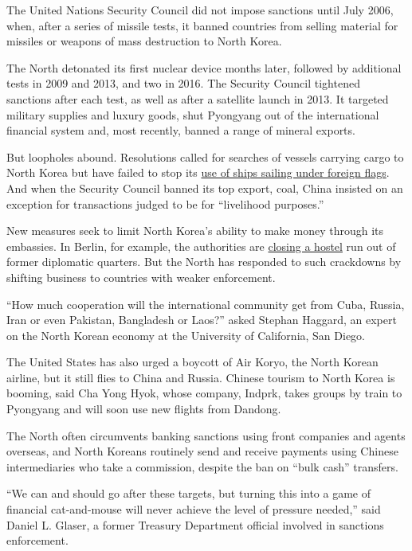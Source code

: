 The United Nations Security Council did not impose sanctions until July
2006, when, after a series of missile tests, it banned countries from
selling material for missiles or weapons of mass destruction to North
Korea.

The North detonated its first nuclear device months later, followed by
additional tests in 2009 and 2013, and two in 2016. The Security Council
tightened sanctions after each test, as well as after a satellite launch
in 2013. It targeted military supplies and luxury goods, shut Pyongyang
out of the international financial system and, most recently, banned a
range of mineral exports.

But loopholes abound. Resolutions called for searches of vessels
carrying cargo to North Korea but have failed to stop its
\href{http://www.nytimes3xbfgragh.onion/2006/10/20/world/asia/20shipping.html}{use
of ships sailing under foreign flags}. And when the Security Council
banned its top export, coal, China insisted on an exception for
transactions judged to be for ``livelihood purposes.''

New measures seek to limit North Korea's ability to make money through
its embassies. In Berlin, for example, the authorities are
\href{https://www.nytimes3xbfgragh.onion/2017/05/10/world/europe/north-korea-germany-berlin-hostel-sanctions.html}{closing
a hostel} run out of former diplomatic quarters. But the North has
responded to such crackdowns by shifting business to countries with
weaker enforcement.

``How much cooperation will the international community get from Cuba,
Russia, Iran or even Pakistan, Bangladesh or Laos?'' asked Stephan
Haggard, an expert on the North Korean economy at the University of
California, San Diego.

The United States has also urged a boycott of Air Koryo, the North
Korean airline, but it still flies to China and Russia. Chinese tourism
to North Korea is booming, said Cha Yong Hyok, whose company, Indprk,
takes groups by train to Pyongyang and will soon use new flights from
Dandong.

The North often circumvents banking sanctions using front companies and
agents overseas, and North Koreans routinely send and receive payments
using Chinese intermediaries who take a commission, despite the ban on
``bulk cash'' transfers.

``We can and should go after these targets, but turning this into a game
of financial cat-and-mouse will never achieve the level of pressure
needed,'' said Daniel L. Glaser, a former Treasury Department official
involved in sanctions enforcement.

